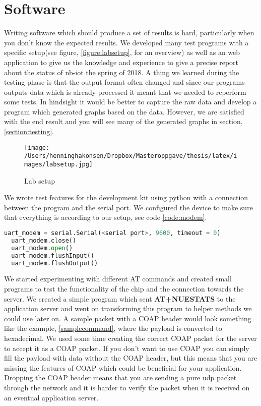 \documentclass[USenglish]{ifimaster}  %
\begin{document}
\section{Software}
Writing software which should produce a set of results is hard, particularly when you don't know the expected results. We developed many test programs with a specific setup(see figure, \vref{figure:labsetup}, for an overview) as well as an web application to give us the knowledge and experience to give a precise report about the status of \acrshort{nb-iot} the spring of 2018. A thing we learned during the testing phase is that the output format often changed and since our programs outputs data which is already processed it meant that we needed to reperform some tests. In hindsight it would be better to capture the raw data and develop a program which generated graphs based on the data. However, we are satisfied with the end result and you will see many of the generated graphs in section, \vref{section:testing}.

\begin{figure}[ht]
  \centering\texttt{[image: /Users/henninghakonsen/Dropbox/Masteroppgave/thesis/latex/images/labsetup.jpg]}
  \caption[Lab setup overview]{Lab setup \cite{pcpng35052:online} \cite{fluke88435:online} \cite{ingagrue31:online}}
  \label{figure:labsetup}
\end{figure}

We wrote test features for the development kit using python with a connection between the program and the serial port. We configured the device to make sure that everything is according to our setup, see code \vref{code:modem}.

\begin{lstlisting}[caption={Development kit initiation},label={code:modem},language=Python]
  uart_modem = serial.Serial(<serial port>, 9600, timeout = 0)
  uart_modem.close()
  uart_modem.open()
  uart_modem.flushInput()
  uart_modem.flushOutput()
\end{lstlisting}

We started experimenting with different AT commands and created small programs to test the functionality of the chip and the connection towards the server. We created a simple program which sent \textbf{AT+NUESTATS} to the application server and went on transforming this program to helper methods we could use later on. A sample packet with a COAP header would look something like the example, \vref{samplecommand}, where the payload is converted to hexadecimal. We used some time creating the correct COAP packet for the server to accept it as a COAP packet. If you don't want to use COAP you can simply fill the payload with data without the COAP header, but this means that you are missing the features of COAP which could be beneficial for your application. Dropping the COAP header means that you are sending a pure \acrshort{udp} packet through the network and it is harder to verify the packet when it is received on an eventual application server.
\end{document}
